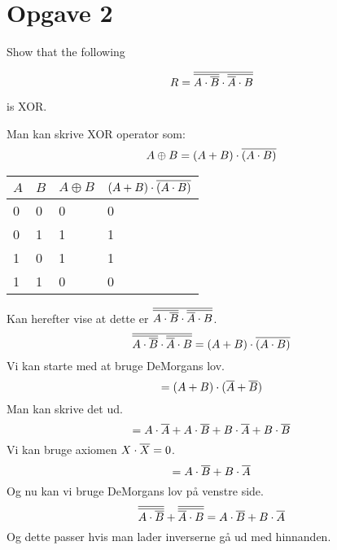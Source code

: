 \section{Opgave 2}

\begin{opg}
    Show that the following

    \begin{equation*}
        R = \overline{\overline{A \cdot \overline{B}} \cdot \overline{\overline{A} \cdot B}}
    \end{equation*}

    is XOR.
\end{opg}

Man kan skrive XOR operator som:
\begin{equation*}
    A \oplus B = (A + B) \cdot \overline{(A \cdot B)}
\end{equation*}

\begin{tabular}{ll|ll} \toprule
    $A$ & $B$ & $A \oplus B$ & $(A + B) \cdot \overline{(A \cdot B)}$ \\ \midrule
    0 & 0 & 0 & 0 \\
    0 & 1 & 1 & 1 \\
    1 & 0 & 1 & 1 \\
    1 & 1 & 0 & 0 \\ \bottomrule
\end{tabular}

Kan herefter vise at dette er $\overline{\overline{A \cdot \overline{B}} \cdot \overline{\overline{A} \cdot B}}$.
\begin{equation*}
    \overline{\overline{A \cdot \overline{B}} \cdot \overline{\overline{A} \cdot B}} = (A + B) \cdot \overline{(A \cdot B)}\\
\end{equation*}
Vi kan starte med at bruge DeMorgans lov.
\begin{equation*}
    = (A + B) \cdot (\overline{A} + \overline{B}) \\
\end{equation*}
Man kan skrive det ud.
\begin{equation*}
    = A \cdot \overline{A} + A \cdot \overline{B} + B \cdot \overline{A} + B \cdot \overline{B}
\end{equation*}
Vi kan bruge axiomen $X \cdot \overline{X} = 0$.
\begin{equation*}
    = A \cdot \overline{B} + B \cdot \overline{A}
\end{equation*}
Og nu kan vi bruge DeMorgans lov på venstre side.
\begin{equation*}
    \overline{ \overline{A \cdot \overline{B}}} + \overline{ \overline{\overline{A} \cdot B}} = A \cdot \overline{B} + B \cdot \overline{A}
\end{equation*}
Og dette passer hvis man lader inverserne gå ud med hinnanden.


